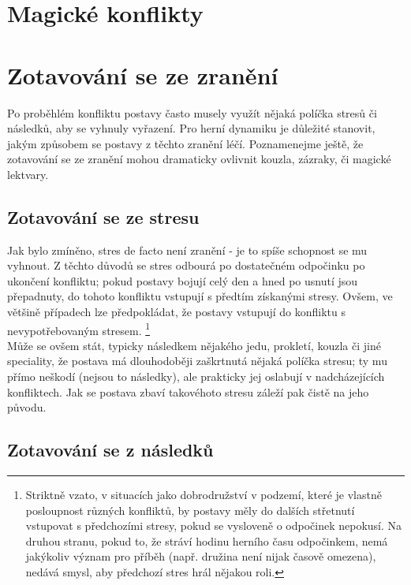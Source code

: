\documentclass[../main.tex]{subfiles}
\begin{document}
\section{Magické konflikty}
\label{sec:magicke-konflikty}

\section{Zotavování se ze zranění}
\label{sec:zotavovanise}

Po proběhlém konfliktu postavy často musely využít nějaká políčka stresů či následků, aby se vyhnuly vyřazení. Pro herní dynamiku je důležité stanovit, jakým způsobem se postavy z těchto zranění léčí. Poznamenejme ještě, že zotavování se ze zranění mohou dramaticky ovlivnit kouzla, zázraky, či magické lektvary.

\subsection{Zotavování se ze stresu}
\label{sec:zot-stresy}

Jak bylo zmíněno, stres de facto není zranění - je to spíše schopnost se mu vyhnout. Z těchto důvodů se stres odbourá po dostatečném odpočinku po ukončení konfliktu; pokud postavy bojují celý den a hned po usnutí jsou přepadnuty, do tohoto konfliktu vstupují s předtím získanými stresy. Ovšem, ve většině případech lze předpokládat, že postavy vstupují do konfliktu s nevypotřebovaným stresem. \footnote{Striktně vzato, v situacích jako dobrodružství v podzemí, které je vlastně posloupnost různých konfliktů, by postavy měly do dalších střetnutí vstupovat s předchozími stresy, pokud se vysloveně o odpočinek nepokusí. Na druhou stranu, pokud to, že stráví hodinu herního času odpočinkem, nemá jakýkoliv význam pro příběh (např. družina není nijak časově omezena), nedává smysl, aby předchozí stres hrál nějakou roli.}\\
Může se ovšem stát, typicky následkem nějakého jedu, prokletí, kouzla či jiné speciality, že postava má dlouhodoběji zaškrtnutá nějaká políčka stresu; ty mu přímo neškodí (nejsou to následky), ale prakticky jej oslabují v nadcházejících konfliktech. Jak se postava zbaví takovéhoto stresu záleží pak čistě na jeho původu.

\subsection{Zotavování se z následků}
\label{sec:zot-nasledky}
\end{document}
